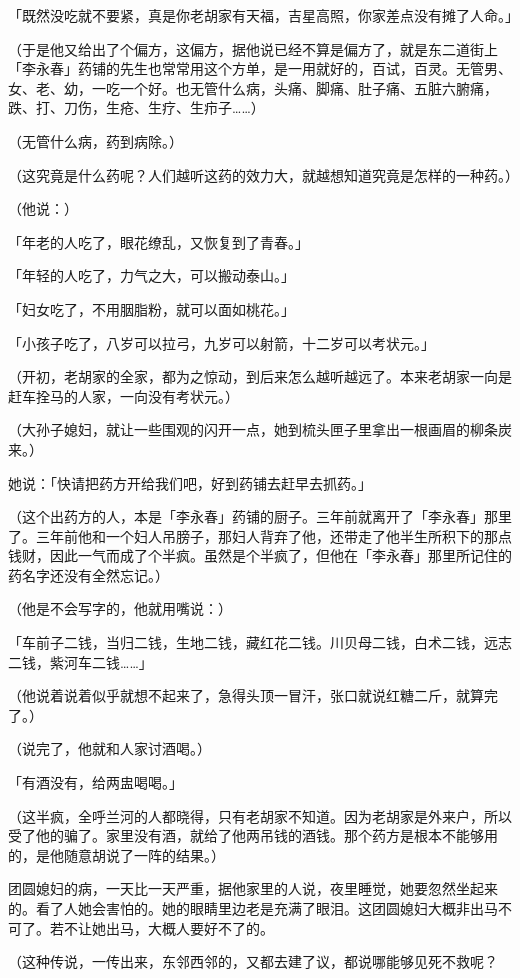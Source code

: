\documentclass[UTF8]{ctexart}
\begin{document}
「既然没吃就不要紧，真是你老胡家有天福，吉星高照，你家差点没有摊了人命。」

（于是他又给出了个偏方，这偏方，据他说已经不算是偏方了，就是东二道街上「李永春」药铺的先生也常常用这个方单，是一用就好的，百试，百灵。无管男、女、老、幼，一吃一个好。也无管什么病，头痛、脚痛、肚子痛、五脏六腑痛，跌、打、刀伤，生疮、生疗、生疖子……）

（无管什么病，药到病除。）

（这究竟是什么药呢？人们越听这药的效力大，就越想知道究竟是怎样的一种药。）

（他说：）

「年老的人吃了，眼花缭乱，又恢复到了青春。」

「年轻的人吃了，力气之大，可以搬动泰山。」

「妇女吃了，不用胭脂粉，就可以面如桃花。」

「小孩子吃了，八岁可以拉弓，九岁可以射箭，十二岁可以考状元。」

（开初，老胡家的全家，都为之惊动，到后来怎么越听越远了。本来老胡家一向是赶车拴马的人家，一向没有考状元。）

（大孙子媳妇，就让一些围观的闪开一点，她到梳头匣子里拿出一根画眉的柳条炭来。）

她说：「快请把药方开给我们吧，好到药铺去赶早去抓药。」

（这个出药方的人，本是「李永春」药铺的厨子。三年前就离开了「李永春」那里了。三年前他和一个妇人吊膀子，那妇人背弃了他，还带走了他半生所积下的那点钱财，因此一气而成了个半疯。虽然是个半疯了，但他在「李永春」那里所记住的药名字还没有全然忘记。）

（他是不会写字的，他就用嘴说：）

「车前子二钱，当归二钱，生地二钱，藏红花二钱。川贝母二钱，白术二钱，远志二钱，紫河车二钱……」

（他说着说着似乎就想不起来了，急得头顶一冒汗，张口就说红糖二斤，就算完了。）

（说完了，他就和人家讨酒喝。）

「有酒没有，给两盅喝喝。」

（这半疯，全呼兰河的人都晓得，只有老胡家不知道。因为老胡家是外来户，所以受了他的骗了。家里没有酒，就给了他两吊钱的酒钱。那个药方是根本不能够用的，是他随意胡说了一阵的结果。）

团圆媳妇的病，一天比一天严重，据他家里的人说，夜里睡觉，她要忽然坐起来的。看了人她会害怕的。她的眼睛里边老是充满了眼泪。这团圆媳妇大概非出马不可了。若不让她出马，大概人要好不了的。

（这种传说，一传出来，东邻西邻的，又都去建了议，都说哪能够见死不救呢？
\end{document}
